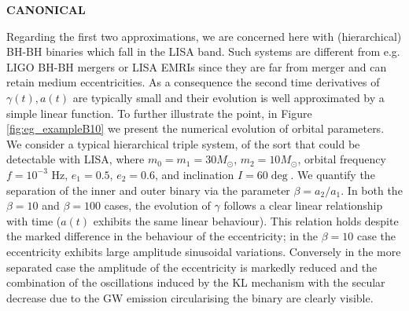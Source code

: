 \documentclass[a4paper,fleqn,usenatbib]{mnras}
\begin{document}
\textbf{CANONICAL}


\noindent Regarding the first two approximations, we are concerned here with (hierarchical) BH-BH binaries which fall in the LISA band. Such systems are different from e.g. LIGO BH-BH mergers or LISA EMRIs since they are far from merger and can retain medium eccentricities. As a consequence the second time derivatives of $\gamma(t), a(t)$ are typically small and their evolution is well approximated by a simple linear function. To further illustrate the point, in Figure \ref{fig:eg_exampleB10} we present the numerical evolution of orbital parameters. We consider a typical hierarchical triple system, of the sort that could be detectable with LISA, where $m_0 = m_1 = 30 M_{\odot}$, $m_2 = 10 M_{\odot}$, orbital frequency $f =10^{-3}$ Hz, $e_1 = 0.5$, $e_2 = 0.6$, and inclination $I = 60 \deg$. We quantify the separation of the inner and outer binary via the parameter $\beta = a_2/a_1$. In both the $\beta = 10$ and $\beta = 100$ cases, the evolution of $\gamma$ follows a clear linear relationship with time ($a(t)$ exhibits the same linear behaviour). This relation holds despite the marked difference in the behaviour of the eccentricity; in the $\beta=10$ case the eccentricity exhibits large amplitude sinusoidal variations. Conversely in the more separated case the amplitude of the eccentricity is markedly reduced and the combination of the oscillations induced by the KL mechanism with the secular decrease due to the GW emission circularising the binary are clearly visible. \newline 
\end{document}
